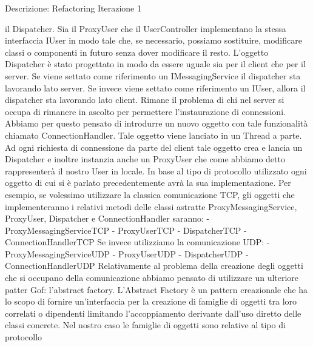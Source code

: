 \begin{frame}[allowframebreaks] {Descrizione: Refactoring Iterazione 1}
\begin{scriptsize}
   il Dispatcher. Sia il ProxyUser che il UserController implementano la stessa interfaccia IUser in modo tale che, se necessario, possiamo sostituire, modificare 
   classi o componenti in futuro senza dover modificare il resto. L'oggetto Dispatcher è stato progettato in modo da essere uguale sia per il client che per il 
   server. Se viene settato come riferimento un IMessagingService il dispatcher sta lavorando lato server. Se invece viene settato come riferimento un IUser, allora 
   il dispatcher sta lavorando lato client.
   \newline
   Rimane il problema di chi nel server si occupa di rimanere in ascolto per permettere l'instaurazione di connessioni. Abbiamo per questo pensato di introdurre un 
   nuovo oggetto con tale funzionalità chiamato ConnectionHandler. Tale oggetto viene lanciato in un Thread a parte. Ad ogni richiesta di connessione da parte del 
   client tale oggetto crea e lancia un Dispatcher e inoltre instanzia anche un ProxyUser che come abbiamo detto rappresenterà il nostro User in locale.
   \newline
   In base al tipo di protocollo utilizzato ogni oggetto di cui si è parlato precedentemente avrà la sua implementazione. Per esempio, se volessimo utilizzare la    
   classica comunicazione TCP, gli oggetti che implementeranno i relativi metodi delle classi astratte ProxyMessagingService, ProxyUser, Dispatcher e 
   ConnectionHandler saranno:
   \newline
   - ProxyMessagingServiceTCP
   \newline
   - ProxyUserTCP
   \newline
   - DispatcherTCP
   \newline 
   - ConnectionHandlerTCP 
   \newline 
   Se invece utilizziamo la comunicazione UDP:
   \newline
   - ProxyMessagingServiceUDP
   \newline
   - ProxyUserUDP
   \newline
   - DispatcherUDP
   \newline 
   - ConnectionHandlerUDP 
   \newline 
   Relativamente al problema della creazione degli oggetti che si occupano della comunicazione abbiamo pensato di utilizzare un ulteriore patter Gof: l'abstract 
   factory. L'Abstract Factory è un pattern creazionale che ha lo scopo di fornire un'interfaccia per la creazione di famiglie di oggetti tra loro correlati o 
   dipendenti limitando l'accoppiamento derivante dall'uso diretto delle classi concrete. Nel nostro caso le famiglie di oggetti sono relative al tipo di protocollo 

\end{scriptsize}
\end{frame}
